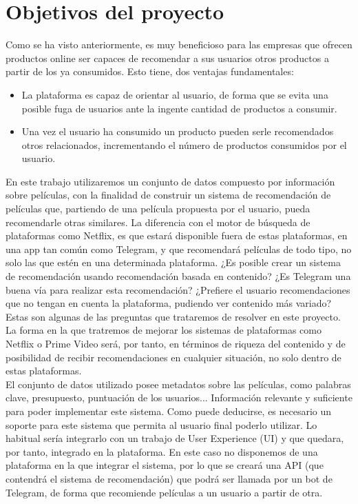 \section{Objetivos del proyecto}\label{sec:objetivos}

Como se ha visto anteriormente, es muy beneficioso para las empresas que ofrecen productos online ser capaces de recomendar a sus usuarios otros productos a partir de los ya consumidos. Esto tiene, dos ventajas fundamentales:

\begin{itemize}
    \item La plataforma es capaz de orientar al usuario, de forma que se evita una posible fuga de usuarios ante la ingente cantidad de productos a consumir.
    
    \item Una vez el usuario ha consumido un producto pueden serle recomendados otros relacionados, incrementando el número de productos consumidos por el usuario.
\end{itemize}

En este trabajo utilizaremos un conjunto de datos compuesto por información sobre películas, con la finalidad de construir un sistema de recomendación de películas que, partiendo de una película propuesta por el usuario, pueda recomendarle otras similares. La diferencia con el motor de búsqueda de plataformas como Netflix, es que estará disponible fuera de estas plataformas, en una app tan común como Telegram, y que recomendará películas de todo tipo, no solo las que estén en una determinada plataforma. ¿Es posible crear un sistema de recomendación usando recomendación basada en contenido? ¿Es Telegram una buena vía para realizar esta recomendación? ¿Prefiere el usuario recomendaciones que no tengan en cuenta la plataforma, pudiendo ver contenido más variado? Estas son algunas de las preguntas que trataremos de resolver en este proyecto. La forma en la que tratremos de mejorar los sistemas de plataformas como Netflix o Prime Video será, por tanto, en términos de riqueza del contenido y de posibilidad de recibir recomendaciones en cualquier situación, no solo dentro de estas plataformas.\\

El conjunto de datos utilizado posee metadatos sobre las películas, como palabras clave, presupuesto, puntuación de los usuarios... Información relevante y suficiente para poder implementar este sistema. Como puede deducirse, es necesario un soporte para este sistema que permita al usuario final poderlo utilizar. Lo habitual sería integrarlo con un trabajo de User Experience (UI) y que quedara, por tanto, integrado en la plataforma. En este caso no disponemos de una plataforma en la que integrar el sistema, por lo que se creará una API (que contendrá el sistema de recomendación) que podrá ser llamada por un bot de Telegram, de forma que recomiende películas a un usuario a partir de otra.\\

